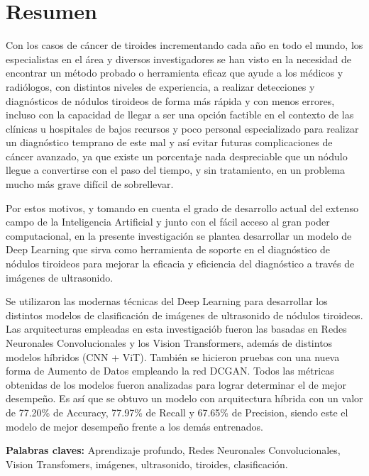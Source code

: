 
\chapter*{Resumen}

Con los casos de cáncer de tiroides incrementando cada año en todo el mundo, los especialistas en el área y diversos investigadores se han visto en la necesidad de encontrar un método probado o herramienta eficaz que ayude a los médicos y radiólogos, con distintos niveles de experiencia, a realizar detecciones y diagnósticos de nódulos tiroideos de forma más rápida y con menos errores, incluso con la capacidad de llegar a ser una opción factible en el contexto de las clínicas u hospitales de bajos recursos y poco personal especializado para realizar un diagnóstico temprano de este mal y así evitar futuras complicaciones de cáncer avanzado, ya que existe un porcentaje nada despreciable que un nódulo llegue a convertirse con el paso del tiempo, y sin tratamiento, en un problema mucho más grave difícil de sobrellevar. 

Por estos motivos, y tomando en cuenta el grado de desarrollo actual del extenso campo de la Inteligencia Artificial y junto con el fácil acceso al gran poder computacional, en la presente investigación se plantea desarrollar un modelo de Deep Learning que sirva como herramienta de soporte en el diagnóstico de nódulos tiroideos para mejorar la eficacia y eficiencia del diagnóstico a través de imágenes de ultrasonido.

Se utilizaron las modernas técnicas del Deep Learning para desarrollar los distintos modelos de clasificación de imágenes de ultrasonido de nódulos tiroideos. Las arquitecturas empleadas en esta investigaciób fueron las basadas en Redes Neuronales Convolucionales y los Vision Transformers, además de distintos modelos híbridos (CNN + ViT). También se hicieron pruebas con una nueva forma de Aumento de Datos empleando la red DCGAN. Todos las métricas obtenidas de los modelos fueron analizadas para lograr determinar el de mejor desempeño. Es así que se obtuvo un modelo con arquitectura híbrida con un valor de 77.20\% de Accuracy, 77.97\% de Recall y 67.65\% de Precision, siendo este el modelo de mejor desempeño frente a los demás entrenados.
\newline

\textbf{Palabras claves: } Aprendizaje profundo, Redes Neuronales Convolucionales, Vision Transfomers, imágenes, ultrasonido, tiroides, clasificación.


